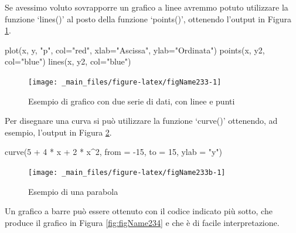 \documentclass[a4paper,12pt,oneside]{book}
\newenvironment{Shaded}{\begin{snugshade}}{\end{snugshade}}
\newcommand{\DecValTok}[1]{#1}
\newcommand{\SpecialCharTok}[1]{#1}
\newcommand{\StringTok}[1]{#1}
\newcommand{\FunctionTok}[1]{#1}
\newcommand{\AttributeTok}[1]{#1}
\newcommand{\NormalTok}[1]{#1}
\begin{document}
Se avessimo voluto sovrapporre un grafico a linee avremmo potuto utilizzare la funzione `lines()' al posto della funzione `points()', ottenendo l'output in Figura \ref{fig:figName233}.

\begin{Shaded}
\begin{Highlighting}[]
\FunctionTok{plot}\NormalTok{(x, y, }\StringTok{"p"}\NormalTok{, }\AttributeTok{col=}\StringTok{"red"}\NormalTok{, }\AttributeTok{xlab=}\StringTok{"Ascissa"}\NormalTok{, }\AttributeTok{ylab=}\StringTok{"Ordinata"}\NormalTok{)}
\FunctionTok{points}\NormalTok{(x, y2, }\AttributeTok{col=}\StringTok{"blue"}\NormalTok{)}
\FunctionTok{lines}\NormalTok{(x, y2, }\AttributeTok{col=}\StringTok{"blue"}\NormalTok{)}
\end{Highlighting}
\end{Shaded}

\begin{figure}

{\centering \texttt{[image: \_main\_files/figure-latex/figName233-1]} 

}

\caption{Esempio di grafico con due serie di dati, con linee e punti}\label{fig:figName233}
\end{figure}

Per disegnare una curva si può utilizzare la funzione `curve()' ottenendo, ad esempio, l'output in Figura \ref{fig:figName233b}.

\begin{Shaded}
\begin{Highlighting}[]
\FunctionTok{curve}\NormalTok{(}\DecValTok{5} \SpecialCharTok{+} \DecValTok{4} \SpecialCharTok{*}\NormalTok{ x }\SpecialCharTok{+} \DecValTok{2} \SpecialCharTok{*}\NormalTok{ x}\SpecialCharTok{\^{}}\DecValTok{2}\NormalTok{, }\AttributeTok{from =} \SpecialCharTok{{-}}\DecValTok{15}\NormalTok{, }\AttributeTok{to =} \DecValTok{15}\NormalTok{, }\AttributeTok{ylab =} \StringTok{"y"}\NormalTok{)}
\end{Highlighting}
\end{Shaded}

\begin{figure}

{\centering \texttt{[image: \_main\_files/figure-latex/figName233b-1]} 

}

\caption{Esempio di una parabola}\label{fig:figName233b}
\end{figure}

Un grafico a barre può essere ottenuto con il codice indicato più sotto, che produce il grafico in Figura \ref{fig:figName234} e che è di facile interpretazione.
\end{document}
